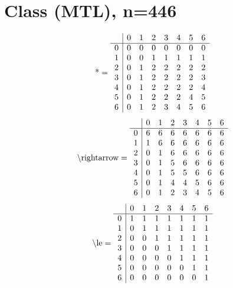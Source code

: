 \documentclass[11pt]{article}
\begin{document}
\section{Class (MTL), n=446}
\[\text{*} = 
\begin{array}{r | r r r r r r r}
 & 0 & 1 & 2 & 3 & 4 & 5 & 6 \\ \hline
0 & 0 & 0 & 0 & 0 & 0 & 0 & 0 \\
1 & 0 & 0 & 1 & 1 & 1 & 1 & 1 \\
2 & 0 & 1 & 2 & 2 & 2 & 2 & 2 \\
3 & 0 & 1 & 2 & 2 & 2 & 2 & 3 \\
4 & 0 & 1 & 2 & 2 & 2 & 2 & 4 \\
5 & 0 & 1 & 2 & 2 & 2 & 4 & 5 \\
6 & 0 & 1 & 2 & 3 & 4 & 5 & 6 \\
\end{array}
\]
\[\text{\textbackslash rightarrow} = 
\begin{array}{r | r r r r r r r}
 & 0 & 1 & 2 & 3 & 4 & 5 & 6 \\ \hline
0 & 6 & 6 & 6 & 6 & 6 & 6 & 6 \\
1 & 1 & 6 & 6 & 6 & 6 & 6 & 6 \\
2 & 0 & 1 & 6 & 6 & 6 & 6 & 6 \\
3 & 0 & 1 & 5 & 6 & 6 & 6 & 6 \\
4 & 0 & 1 & 5 & 5 & 6 & 6 & 6 \\
5 & 0 & 1 & 4 & 4 & 5 & 6 & 6 \\
6 & 0 & 1 & 2 & 3 & 4 & 5 & 6 \\
\end{array}
\]
\[\text{\textbackslash le} = 
\begin{array}{r | r r r r r r r}
 & 0 & 1 & 2 & 3 & 4 & 5 & 6 \\ \hline
0 & 1 & 1 & 1 & 1 & 1 & 1 & 1 \\
1 & 0 & 1 & 1 & 1 & 1 & 1 & 1 \\
2 & 0 & 0 & 1 & 1 & 1 & 1 & 1 \\
3 & 0 & 0 & 0 & 1 & 1 & 1 & 1 \\
4 & 0 & 0 & 0 & 0 & 1 & 1 & 1 \\
5 & 0 & 0 & 0 & 0 & 0 & 1 & 1 \\
6 & 0 & 0 & 0 & 0 & 0 & 0 & 1 \\
\end{array}
\]
\end{document}
